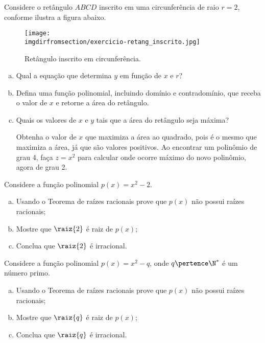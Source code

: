 \begin{exercise}
  Considere o retângulo $ABCD$ inscrito em uma circunferência de raio $r = 2$, conforme ilustra a figura abaixo.
  \begin{figure}[H]
    \centering
    \label{fig:exercicio-retang_inscrito}
    \texttt{[image: \\imgdirfromsection/exercicio-retang\_inscrito.jpg]}
    \caption{Retângulo inscrito em circunferência.}
  \end{figure}
  \begin{enumerate}[a)]
      \item Qual a equação que determina $y$ em função de $x$ e $r$?
      \item Defina uma função polinomial, incluindo domínio e contradomínio, que receba o valor de $x$ e retorne a área do retângulo.
      \item Quais os valores de $x$ e $y$ tais que a área do retângulo seja máxima? 
      \begin{hint}
        Obtenha o valor de $x$ que maximiza a área ao quadrado, pois é o mesmo que maximiza a área, já que são valores positivos. Ao encontrar um polinômio de grau 4, faça $z=x^2$ para calcular onde ocorre máximo do novo polinômio, agora de grau 2.
      \end{hint} 
  \end{enumerate}
\end{exercise}

\begin{exercise}
  Considere a função polinomial $p(x)=x^2-2$.
  \begin{enumerate}[a)]
    \item Usando o Teorema de raízes racionais prove que $p(x)$ não possui raízes racionais;
    \item Mostre que $\raiz{2}$ é raiz de $p(x)$;
    \item Conclua que $\raiz{2}$ é irracional.
  \end{enumerate}
\end{exercise}

\begin{exercise}
  Considere a função polinomial $p(x)=x^2-q$, onde $q \pertence \N^\ast$ é um número primo.
  \begin{enumerate}[a)]
    \item Usando o Teorema de raízes racionais prove que $p(x)$ não possui raízes racionais;
    \item Mostre que $\raiz{q}$ é raiz de $p(x)$;
    \item Conclua que $\raiz{q}$ é irracional.
\end{enumerate}
\end{exercise}

